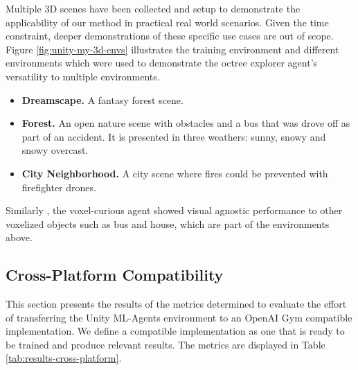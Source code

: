 Multiple 3D scenes have been collected and setup to demonstrate the applicability of our method in practical real world scenarios. Given the time constraint, deeper demonstrations of these specific use cases are out of scope.
Figure \ref{fig:unity-my-3d-envs} illustrates the training environment and different environments which were used to demonstrate the octree explorer agent's versatility to multiple environments.
\begin{itemize}
    \item \textbf{Dreamscape.} A fantasy forest scene.
    \item \textbf{Forest.} An open nature scene with obstacles and a bus that was drove off as part of an accident. It is presented in three weathers: sunny, snowy and snowy overcast.
    \item \textbf{City Neighborhood.} A city scene where fires could be prevented with firefighter drones.
\end{itemize}

Similarly , the voxel-curious agent showed visual agnostic performance to other voxelized objects such as bus and house, which are part of the environments above. 





\subsection{Cross-Platform Compatibility}\label{chap:4:cross-platform-compatibility}
This section presents the results of the metrics determined to evaluate the effort of transferring the Unity ML-Agents environment to an OpenAI Gym compatible implementation. We define a compatible implementation as one that is ready to be trained and produce relevant results. The metrics are displayed in Table \ref{tab:results-cross-platform}.

